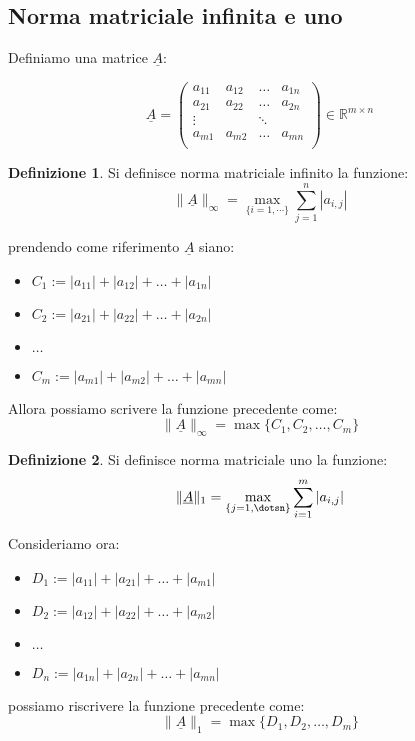 \documentclass[12pt, a4paper]{book}
\theoremstyle{definition}
\newtheorem{defn}{Definizione}[section]
\newcommand{\VarMtrx}[1]{\ensuremath{\underline{#1}}}
\begin{document}
\subsection{Norma matriciale infinita e uno}
\begin{flushleft}

Definiamo una matrice $\VarMtrx{A}$: 

\[
		\VarMtrx{A} = 
								\begin{pmatrix} 
								a_{11} & a_{12} & \dots &  a_{1n} \\  
								a_{21} & a_{22} & \dots &  a_{2n} \\
								\vdots &			 & \ddots	&				\\
								a_{m1} & a_{m2} & \dots &  a_{mn} \\
								\end{pmatrix} 
		\in \mathbb{R}^{m \times n}			
\]

\begin{defn}
Si definisce norma matriciale infinito la funzione:
\[ \lVert\VarMtrx{A}\rVert_{\infty} = \max_{\{i=1,\dotsm\}} \sum_{j=1}^{n} |a_{i,j}| \]
\end{defn}

prendendo come riferimento \VarMtrx{A} siano: 
\begin{itemize}
	\item $C_{1}:= |a_{11}| + |a_{12}| + \dots + |a_{1n}|$
	\item $C_{2}:= |a_{21}| + |a_{22}| + \dots + |a_{2n}|$
	\item $\dots$
	\item  $C_{m}:= |a_{m1}| + |a_{m2}| + \dots + |a_{mn}|$
\end{itemize}

Allora possiamo scrivere la funzione precedente come: 
\[ \lVert\VarMtrx{A}\rVert_{\infty} = \max \{ C_{1}, C_{2}, \dots,  C_{m}\}\]

\newpage
\begin{defn}
Si definisce norma matriciale uno la funzione:
\[ \lVert\VarMtrx{A}\rVert_{1} = \max_{\{j=1,\dotsn\}} \sum_{i=1}^{m} |a_{i,j}| \]
\end{defn}

Consideriamo ora: 
\begin{itemize}
	\item  $D_{1}:= |a_{11}| + |a_{21}| + \dots + |a_{m1}|$
	\item  $D_{2}:= |a_{12}| + |a_{22}| + \dots + |a_{m2}|$
	\item $\dots$
	\item  $D_{n}:= |a_{1n}| + |a_{2n}| + \dots + |a_{mn}|$
\end{itemize}

possiamo riscrivere la funzione precedente come: 
\[ \lVert\VarMtrx{A}\rVert_{1} = \max \{ D_{1}, D_{2}, \dots,  D_{m}\}\]
\end{flushleft}
\end{document}

